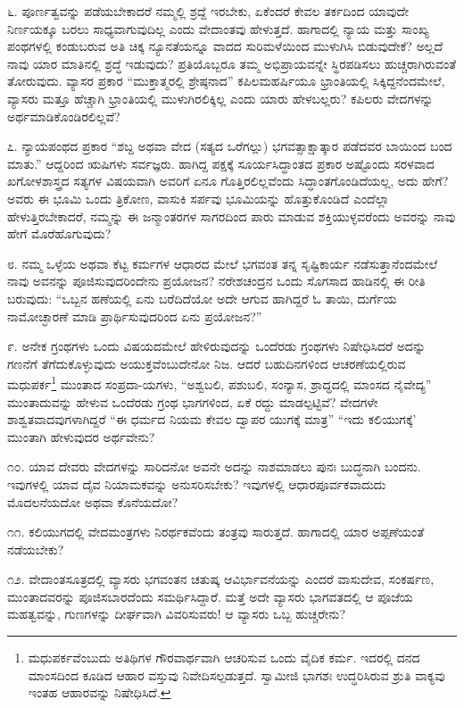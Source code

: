 ೬. ಪೂರ್ಣತ್ವವನ್ನು ಪಡೆಯಬೇಕಾದರೆ ನಮ್ಮಲ್ಲಿ ಶ್ರದ್ದೆ ಇರಬೇಕು, ಏಕೆಂದರೆ ಕೇವಲ ತರ್ಕದಿಂದ ಯಾವುದೇ ನಿರ್ಣಯಕ್ಕೂ ಬರಲು ಸಾಧ್ಯವಾಗುವುದಿಲ್ಲ ಎಂದು ವೇದಾಂತವು ಹೇಳುತ್ತದೆ. ಹಾಗಾದಲ್ಲಿ ನ್ಯಾಯ ಮತ್ತು ಸಾಂಖ್ಯ ಪಂಥಗಳಲ್ಲಿ ಕಂಡುಬರುವ ಅತಿ ಚಿಕ್ಕ ನ್ಯೂನತೆಯನ್ನೂ ವಾದದ ಸುರಿಮಳೆಯಿಂದ ಮುಳುಗಿಸಿ ಬಿಡುವುದೇಕೆ? ಅಲ್ಲದೆ ನಾವು ಯಾರ ಮಾತಿನಲ್ಲಿ ಶ್ರದ್ಧೆ ಇಡುವುದು? ಪ್ರತಿಯೊಬ್ಬರೂ ತಮ್ಮ ಅಭಿಪ್ರಾಯವನ್ನೇ ಸ್ಥಿರಪಡಿಸಲು ಹುಚ್ಚರಾಗಿರುವಂತೆ ತೋರುವುದು. ವ್ಯಾಸರ ಪ್ರಕಾರ “ಮುಕ್ತಾತ್ಮರಲ್ಲಿ ಶ್ರೇಷ್ಠನಾದ” ಕಪಿಲಮಹರ್ಷಿಯೂ ಭ್ರಾಂತಿಯಲ್ಲಿ ಸಿಕ್ಕಿದ್ದನೆಂದಮೇಲೆ, ವ್ಯಾಸರು ಮತ್ತೂ ಹೆಚ್ಚಾಗಿ ಭ್ರಾಂತಿಯಲ್ಲಿ ಮುಳುಗಿರಲಿಕ್ಕಿಲ್ಲ ಎಂದು ಯಾರು ಹೇಳಬಲ್ಲರು? ಕಪಿಲರು ವೇದಗಳನ್ನು ಅರ್ಥಮಾಡಿಕೊಂಡಿರಲಿಲ್ಲವೆ?

೭. ನ್ಯಾಯಪಂಥದ ಪ್ರಕಾರ “ಶಬ್ದ ಅಥವಾ ವೇದ (ಸತ್ಯದ ಒರೆಗಲ್ಲು) ಭಗವತ್ಸಾಕ್ಷಾ\-ತ್ಕಾರ ಪಡೆದವರ ಬಾಯಿಂದ ಬಂದ ಮಾತು.” ಆದ್ದರಿಂದ ಋಷಿಗಳು ಸರ್ವಜ್ಞರು. ಹಾಗಿದ್ದ ಪಕ್ಷಕ್ಕೆ ಸೂರ್ಯಸಿದ್ಧಾಂತದ ಪ್ರಕಾರ ಅಷ್ಟೊಂದು ಸರಳವಾದ ಖಗೋಳಶಾಸ್ತ್ರದ ಸತ್ಯಗಳ ವಿಷಯವಾಗಿ ಅವರಿಗೆ ಏನೂ ಗೊತ್ತಿರಲಿಲ್ಲವೆಂದು ಸಿದ್ಧಾಂತಗೊಂಡಿದೆಯಲ್ಲ, ಅದು ಹೇಗೆ? ಅವರು ಈ ಭೂಮಿ ಒಂದು ತ್ರಿಕೋಣ, ವಾಸುಕಿ ಸರ್ಪವು ಭೂಮಿಯನ್ನು ಹೊತ್ತುಕೊಂಡಿದೆ ಎಂದೆಲ್ಲಾ ಹೇಳುತ್ತಿರಬೇಕಾದರೆ, ನಮ್ಮನ್ನು ಈ ಜನ್ಮಾಂತರಗಳ ಸಾಗರ\break ದಿಂದ ಪಾರು ಮಾಡುವ ಶಕ್ತಿಯುಳ್ಳವರೆಂದು ಅವರನ್ನು ನಾವು ಹೇಗೆ ಮೊರೆಹೊಗುವುದು?

೮. ನಮ್ಮ ಒಳ್ಳೆಯ ಅಥವಾ ಕೆಟ್ಟ ಕರ್ಮಗಳ ಆಧಾರದ ಮೇಲೆ ಭಗವಂತ ತನ್ನ ಸೃಷ್ಟಿಕಾರ್ಯ ನಡೆಸುತ್ತಾನೆಂದಮೇಲೆ ನಾವು ಅವನನ್ನು ಪೂಜಿಸುವುದರಿಂದೇನು ಪ್ರಯೋಜನ? ನರೇಶಚಂದ್ರನ ಒಂದು ಸೊಗಸಾದ ಹಾಡಿನಲ್ಲಿ ಈ ರೀತಿ ಬರುವುದು: “ಒಬ್ಬನ ಹಣೆಯಲ್ಲಿ ಏನು ಬರೆದಿದೆಯೋ ಅದೇ ಆಗುವ ಹಾಗಿದ್ದರೆ ಓ ತಾಯಿ, ದುರ್ಗೆಯ ನಾಮೋಚ್ಛಾರಣೆ ಮಾಡಿ ಪ್ರಾರ್ಥಿಸುವುದರಿಂದ ಏನು ಪ್ರಯೋಜನ?”

೯. ಅನೇಕ ಗ್ರಂಥಗಳು ಒಂದು ವಿಷಯದಮೇಲೆ ಹೇಳಿರುವುದನ್ನು ಒಂದೆರಡು ಗ್ರಂಥಗಳು ನಿಷೇಧಿಸಿದರೆ ಅದನ್ನು ಗಣನೆಗೆ ತೆಗೆದುಕೊಳ್ಳುವುದು ಅಯುಕ್ತವೆಂಬುದೇನೋ ನಿಜ. ಆದರೆ ಬಹುದಿನಗಳಿಂದ ಆಚರಣೆಯಲ್ಲಿರುವ ಮಧುಪರ್ಕ\footnote{ಮಧುಪರ್ಕವೆಂಬುದು ಅತಿಥಿಗಳ ಗೌರವಾರ್ಥವಾಗಿ ಆಚರಿಸುವ ಒಂದು ವೈದಿಕ ಕರ್ಮ. ಇದರಲ್ಲಿ ದನದ ಮಾಂಸದಿಂದ ಕೂಡಿದ ಆಹಾರ ವಸ್ತುವು ನಿವೇದಿಸಲ್ಪಡುತ್ತದೆ. ಸ್ವಾಮೀಜಿ ಭಾಗಶಃ ಉದ್ಧರಿಸಿರುವ ಶ್ರುತಿ ವಾಕ್ಯವು ಇಂತಹ ಆಹಾರವನ್ನು ನಿಷೇಧಿಸಿದೆ.} ಮುಂತಾದ ಸಂಪ್ರದಾ-\-ಯಗಳು, “ಅಶ್ವಬಲಿ, ಪಶುಬಲಿ, ಸಂನ್ಯಾಸ, ಶ್ರಾದ್ಧದಲ್ಲಿ ಮಾಂಸದ ನೈವೇದ್ಯ” \enginline{-} ಮುಂತಾದುವನ್ನು ಹೇಳುವ ಒಂದೆರಡು ಗ್ರಂಥ ಭಾಗಗಳಿಂದ, ಏಕೆ ರದ್ದು ಮಾಡಲ್ಪಟ್ಟಿವೆ? ವೇದಗಳೇ ಶಾಶ್ವತವಾದವುಗಳಾಗಿದ್ದರೆ “ಈ ಧರ್ಮದ ನಿಯಮ ಕೇವಲ ದ್ವಾಪರ ಯುಗಕ್ಕೆ ಮಾತ್ರ” “ಇದು ಕಲಿಯುಗಕ್ಕೆ’ ಮುಂತಾಗಿ ಹೇಳುವುದರ ಅರ್ಥವೇನು?

೧೦. ಯಾವ ದೇವರು ವೇದಗಳನ್ನು ಸಾರಿದನೋ ಅವನೇ ಅದನ್ನು ನಾಶ\break ಮಾಡಲು ಪುನಃ ಬುದ್ಧನಾಗಿ ಬಂದನು. ಇವುಗಳಲ್ಲಿ ಯಾವ ದೈವ ನಿಯಾಮಕವನ್ನು ಅನುಸರಿಸಬೇಕು? ಇವುಗಳಲ್ಲಿ ಆಧಾರಪೂರ್ವಕವಾದುದು ಮೊದಲನೆಯದೋ ಅಥವಾ ಕೊನೆಯದೋ?

೧೧. ಕಲಿಯುಗದಲ್ಲಿ ವೇದಮಂತ್ರಗಳು ನಿರರ್ಥಕವೆಂದು ತಂತ್ರವು ಸಾರುತ್ತದೆ. ಹಾಗಾದಲ್ಲಿ ಯಾರ ಅಪ್ಪಣೆಯಂತೆ ನಡೆಯಬೇಕು?

೧೨. ವೇದಾಂತಸೂತ್ರದಲ್ಲಿ ವ್ಯಾಸರು ಭಗವಂತನ ಚತುಷ್ಕ ಆವಿರ್ಭಾವನೆಯನ್ನು ಎಂದರೆ ವಾಸುದೇವ, ಸಂಕರ್ಷಣ, ಮುಂತಾದವರನ್ನು ಪೂಜಿಸಬಾರದೆಂದು ಸಮರ್ಥಿಸಿದ್ದಾರೆ. ಮತ್ತೆ ಅದೇ ವ್ಯಾಸರು ಭಾಗವತದಲ್ಲಿ ಆ ಪೂಜೆಯ ಮಹತ್ವವನ್ನು, ಗುಣಗಳನ್ನು ದೀರ್ಘವಾಗಿ ವಿವರಿಸುವರು! ಆ ವ್ಯಾಸರು ಒಬ್ಬ ಹುಚ್ಚರೇನು?

